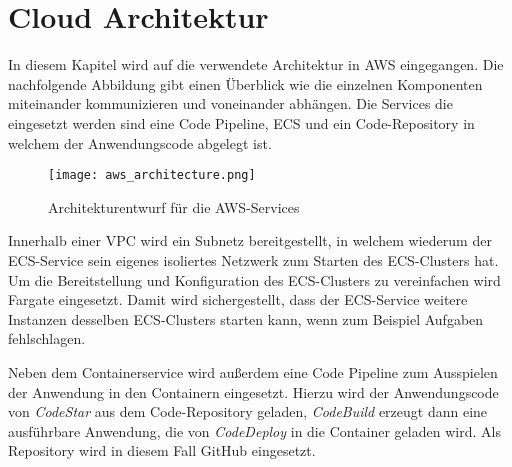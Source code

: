 \section{Cloud Architektur}
In diesem Kapitel wird auf die verwendete Architektur in \ac{AWS} eingegangen. Die nachfolgende Abbildung gibt einen Überblick wie die einzelnen Komponenten miteinander kommunizieren und voneinander abhängen. Die Services die eingesetzt werden sind eine Code Pipeline, \ac{ECS} und ein Code-\gls{Repository} in welchem der Anwendungscode abgelegt ist.

\begin{figure}[H]
    \centering
    \texttt{[image: aws\_architecture.png]}
    \caption{Architekturentwurf für die AWS-Services}
    \label{fig:CloudArchitektur}
\end{figure}

Innerhalb einer \ac{VPC} wird ein Subnetz bereitgestellt, in welchem wiederum der \ac{ECS}-Service sein eigenes isoliertes Netzwerk zum Starten des \ac{ECS}-Clusters hat. Um die Bereitstellung und Konfiguration des \ac{ECS}-Clusters zu vereinfachen wird Fargate eingesetzt. Damit wird sichergestellt, dass der \ac{ECS}-Service weitere Instanzen desselben \ac{ECS}-Clusters starten kann, wenn zum Beispiel Aufgaben fehlschlagen.

Neben dem Containerservice wird außerdem eine Code Pipeline zum Ausspielen der Anwendung in den Containern eingesetzt. Hierzu wird der Anwendungscode von \textit{CodeStar} aus dem Code-\gls{Repository} geladen, \textit{CodeBuild} erzeugt dann eine ausführbare Anwendung, die von \textit{CodeDeploy} in die Container geladen wird. Als \gls{Repository} wird in diesem Fall \gls{GitHub} eingesetzt.